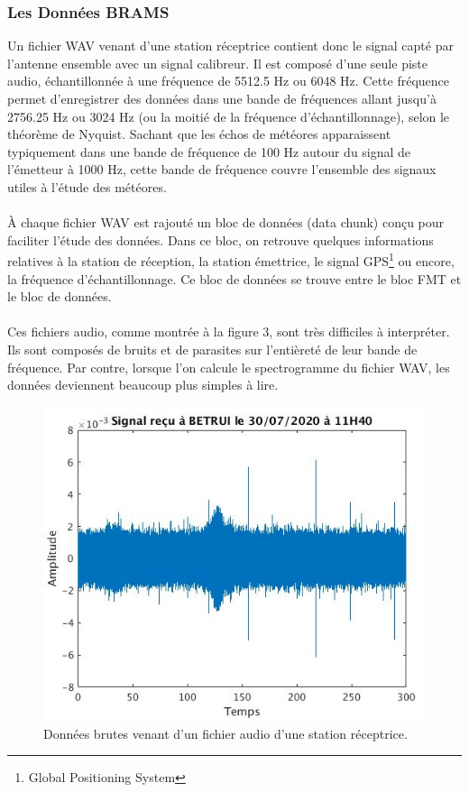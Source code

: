 \documentclass[11pt]{article}
\begin{document}
\subsubsection{Les Données BRAMS}

Un fichier WAV venant d'une station réceptrice contient donc le signal capté par l'antenne ensemble avec un signal calibreur.
Il est composé d'une seule piste audio, échantillonnée à une fréquence de 5512.5 Hz ou 6048 Hz.
Cette fréquence permet d'enregistrer des données dans une bande de fréquences allant jusqu'à 2756.25 Hz ou 3024 Hz (ou la moitié de la fréquence d'échantillonnage), selon le théorème de Nyquist.
Sachant que les échos de météores apparaissent typiquement dans une bande de fréquence de 100 Hz autour du signal de l'émetteur à 1000 Hz, cette bande de fréquence couvre l'ensemble des signaux utiles à l'étude des météores.\\
\\
À chaque fichier WAV est rajouté un bloc de données (data chunk) conçu pour faciliter l'étude des données.
Dans ce bloc, on retrouve quelques informations relatives à la station de réception, la station émettrice, le signal GPS\footnote{Global Positioning System} ou encore, la fréquence d'échantillonnage.
Ce bloc de données se trouve entre le bloc FMT et le bloc de données.\\
\\
Ces fichiers audio, comme montrée à la figure 3, sont très difficiles à interpréter.
Ils sont composés de bruits et de parasites sur l'entièreté de leur bande de fréquence.
Par contre, lorsque l'on calcule le spectrogramme du fichier WAV, les données deviennent beaucoup plus simples à lire.
\begin{figure}[t]
    \begin{center}
        \includegraphics[scale=0.5]{wav_brut.png}
        \caption{Données brutes venant d'un fichier audio d'une station réceptrice.}
    \end{center}
\end{figure}
\end{document}
